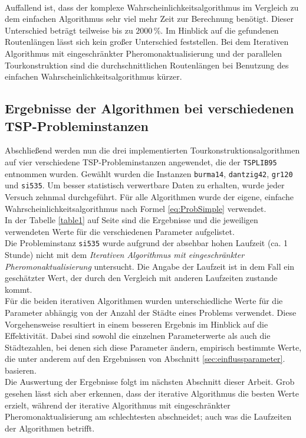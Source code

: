 \documentclass[doktyp=barbeit, sprache=german]{TUBAFarbeiten}
\begin{document}
\\Auffallend ist, dass der komplexe Wahrscheinlichkeitsalgorithmus im Vergleich zu dem einfachen Algorithmus sehr viel mehr Zeit zur Berechnung benötigt. Dieser Unterschied beträgt teilweise bis zu $2000 \,\%$.
Im Hinblick auf die gefundenen Routenlängen lässt  sich kein großer Unterschied feststellen. Bei dem Iterativen Algorithmus mit eingeschränkter Pheromonaktualisierung und der parallelen Tourkonstruktion sind die durchschnittlichen Routenlängen bei Benutzung des einfachen Wahrscheinlichkeitsalgorithmus kürzer.
\subsection{Ergebnisse der Algorithmen bei verschiedenen TSP-Probleminstanzen}
Abschließend werden nun die drei implementierten Tourkonstruktionsalgorithmen auf vier verschiedene TSP-Probleminstanzen angewendet, die der \texttt{TSPLIB95} entnommen wurden. Gewählt wurden die Instanzen \texttt{burma14}, \texttt{dantzig42}, \texttt{gr120} und \texttt{si535}. Um besser statistisch verwertbare Daten zu erhalten, wurde jeder Versuch zehnmal durchgeführt. Für alle Algorithmen wurde der eigene, einfache Wahrscheinlichkeitsalgorithmus nach Formel \ref{eq:ProbSimple} verwendet.
\\In der Tabelle \ref{table1} auf Seite \pageref{table1} sind die Ergebnisse und die jeweiligen verwendeten Werte für die verschiedenen Parameter aufgelistet.
\\Die Probleminstanz \texttt{si535} wurde aufgrund der absehbar hohen Laufzeit (ca. 1 Stunde) nicht mit dem \textit{Iterativen Algorithmus mit eingeschränkter Pheromonaktualisierung} untersucht. Die Angabe der Laufzeit ist in dem Fall ein geschätzter Wert, der durch den Vergleich mit anderen Laufzeiten zustande kommt.
\\Für die beiden iterativen Algorithmen wurden unterschiedliche Werte für die Parameter abhängig von der Anzahl der Städte eines Problems verwendet. Diese Vorgehensweise resultiert in einem besseren Ergebnis im Hinblick auf die Effektivität. Dabei sind sowohl die einzelnen Parameterwerte als auch die Städtezahlen, bei denen sich diese Parameter ändern, empirisch bestimmte Werte, die unter anderem auf den Ergebnissen von Abschnitt \ref{sec:einflussparameter}. basieren.
\\Die Auswertung der Ergebnisse folgt im nächsten Abschnitt dieser Arbeit. Grob gesehen lässt sich aber erkennen, dass der iterative Algorithmus die besten Werte erzielt, während der iterative Algorithmus mit eingeschränkter Pheromonaktualisierung am schlechtesten abschneidet; auch was die Laufzeiten der Algorithmen betrifft.
\end{document}
